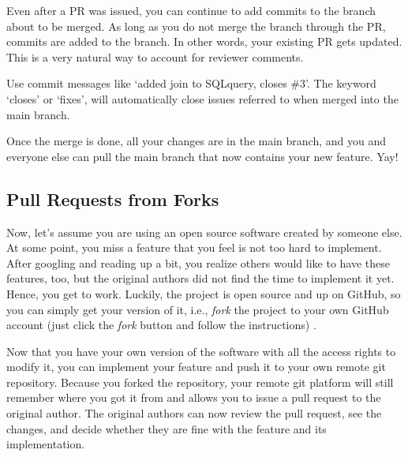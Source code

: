 \documentclass[
  12pt,
  letterpaper,
]{krantz}
\begin{document}
Even after a PR was issued, you can continue to add
commits to the branch about to be merged. As long as you do not merge
the branch through the PR, commits are added to the branch. In other
words, your existing PR gets updated. This is a very natural way to
account for reviewer comments.

\begin{tcolorbox}[enhanced jigsaw, left=2mm, arc=.35mm, colbacktitle=quarto-callout-note-color!10!white, breakable, colframe=quarto-callout-note-color-frame, bottomrule=.15mm, bottomtitle=1mm, colback=white, leftrule=.75mm, coltitle=black, toptitle=1mm, titlerule=0mm, title=\textcolor{quarto-callout-note-color}{\faInfo}\hspace{0.5em}{Note}, opacityback=0, rightrule=.15mm, toprule=.15mm, opacitybacktitle=0.6]

Use commit messages like `added join to SQLquery, closes
\#3'. The keyword `closes' or `fixes', will automatically close issues
referred to when merged into the main branch.

\end{tcolorbox}

Once the merge is done, all your changes are in the main branch, and you
and everyone else can pull the main branch that now contains your new
feature. Yay!

\hypertarget{pull-requests-from-forks}{%
\subsection{\texorpdfstring{Pull Requests from
Forks}{Pull Requests from Forks}}\label{pull-requests-from-forks}}

Now, let's assume you are using an open source software created by
someone else. At some point, you miss a feature that you feel is not too
hard to implement. After googling and reading up a bit, you realize
others would like to have these features, too, but the original authors
did not find the time to implement it yet. Hence, you get to work.
Luckily, the project is open source and up on GitHub, so you can simply
get your version of it, i.e., \emph{fork} the project to your own GitHub
account (just click the \emph{fork} button and follow the instructions)
.

Now that you have your own version of the software with all the access
rights to modify it, you can implement your feature and push it to your
own remote git repository. Because you forked the repository, your
remote git platform will still remember where you got it from and allows
you to issue a pull request to the original author. The original authors
can now review the pull request, see the changes,
and decide whether they are fine with the feature and its
implementation.
\end{document}

